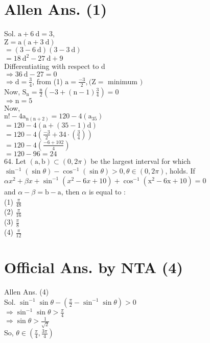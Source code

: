 \documentclass[10pt]{article}
\begin{document}
\section*{Allen Ans. (1)}
Sol. \(\mathrm{a}+6 \mathrm{~d}=3\),\\
\(\mathrm{Z}=\mathrm{a}(\mathrm{a}+3 \mathrm{~d})\)\\
\(=(3-6 \mathrm{~d})(3-3 \mathrm{~d})\)\\
\(=18 \mathrm{~d}^{2}-27 \mathrm{~d}+9\)\\
Differentiating with respect to d\\
\(\Rightarrow 36 \mathrm{~d}-27=0\)\\
\(\Rightarrow \mathrm{d}=\frac{3}{4}\), from (1) \(\mathrm{a}=\frac{-3}{2},(\mathrm{Z}=\) minimum \()\)\\
Now, \(\mathrm{S}_{\mathrm{n}}=\frac{\mathrm{n}}{2}\left(-3+(\mathrm{n}-1) \frac{3}{4}\right)=0\)\\
\(\Rightarrow \mathrm{n}=5\)\\
Now,\\
\(\mathrm{n}!-4 \mathrm{a}_{\mathrm{n}(\mathrm{n}+2)}=120-4\left(\mathrm{a}_{35}\right)\)\\
\(=120-4(\mathrm{a}+(35-1) \mathrm{d})\)\\
\(=120-4\left(\frac{-3}{2}+34 \cdot\left(\frac{3}{4}\right)\right)\)\\
\(=120-4\left(\frac{-6+102}{4}\right)\)\\
\(=120-96=24\)\\
64. Let \((\mathrm{a}, \mathrm{b}) \subset(0,2 \pi)\) be the largest interval for which\\
\(\sin ^{-1}(\sin \theta)-\cos ^{-1}(\sin \theta)>0, \theta \in(0,2 \pi)\), holds. If\\
\(\alpha x^{2}+\beta x+\sin ^{-1}\left(x^{2}-6 x+10\right)+\cos ^{-1} \left(\mathrm{x}^{2}-6 \mathrm{x}+10\right)=0\)\\
and \(\alpha-\beta=\mathrm{b}-\mathrm{a}\), then \(\alpha\) is equal to :\\
(1) \(\frac{\pi}{48}\)\\
(2) \(\frac{\pi}{16}\)\\
(3) \(\frac{\pi}{8}\)\\
(4) \(\frac{\pi}{12}\)

\section*{Official Ans. by NTA (4)}
Allen Ans. (4)\\
Sol. \(\sin ^{-1} \sin \theta-\left(\frac{\pi}{2}-\sin ^{-1} \sin \theta\right)>0\)\\
\(\Rightarrow \sin ^{-1} \sin \theta>\frac{\pi}{4}\)\\
\(\Rightarrow \sin \theta>\frac{1}{\sqrt{2}}\)\\
So, \(\theta \in\left(\frac{\pi}{4}, \frac{3 \pi}{4}\right)\)
\end{document}
